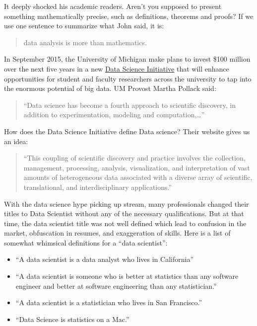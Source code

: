 \documentclass[
]{article}
\providecommand{\tightlist}{%
  \setlength{\itemsep}{0pt}\setlength{\parskip}{0pt}}
\begin{document}
It deeply shocked his academic readers. Aren't you supposed to present
something mathematically precise, such as definitions, theorems and
proofs? If we use one sentence to summarize what John said, it is:

\begin{quote}
data analysis is more than mathematics.
\end{quote}

In September 2015, the University of Michigan make plans to invest \$100
million over the next five years in a new
\href{http://www.ns.umich.edu/new/releases/23105-u-michigan-launches-100-million-data-science-initiative}{Data
Science Initiative} that will enhance opportunities for student and
faculty researchers across the university to tap into the enormous
potential of big data. UM Provost Martha Pollack said:

\begin{quote}
``Data science has become a fourth approach to scientific discovery, in
addition to experimentation, modeling and computation,\ldots{}''
\end{quote}

How does the Data Science Initiative define Data science? Their website
gives us an idea:

\begin{quote}
``This coupling of scientific discovery and practice involves the
collection, management, processing, analysis, visualization, and
interpretation of vast amounts of heterogeneous data associated with a
diverse array of scientific, translational, and interdisciplinary
applications.''
\end{quote}

With the data science hype picking up stream, many professionals changed
their titles to Data Scientist without any of the necessary
qualifications. But at that time, the data scientist title was not well
defined which lead to confusion in the market, obfuscation in resumes,
and exaggeration of skills. Here is a list of somewhat whimsical
definitions for a ``data scientist'':

\begin{itemize}
\tightlist
\item
  ``A data scientist is a data analyst who lives in California''
\item
  ``A data scientist is someone who is better at statistics than any
  software engineer and better at software engineering than any
  statistician.''
\item
  ``A data scientist is a statistician who lives in San Francisco.''
\item
  ``Data Science is statistics on a Mac.''
\end{itemize}
\end{document}
